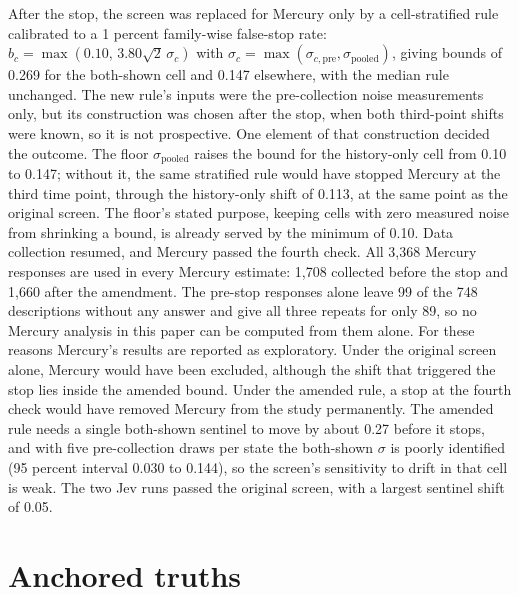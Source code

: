 \documentclass[11pt]{article}
\begin{document}
After the stop, the screen was replaced for Mercury only by a cell-stratified rule calibrated to a 1
percent family-wise false-stop rate: $b_c=\max(0.10,\,3.80\sqrt2\,\sigma_c)$ with
$\sigma_c=\max(\sigma_{c,\text{pre}},\sigma_{\text{pooled}})$, giving bounds of 0.269 for the
both-shown cell and 0.147 elsewhere, with the median rule unchanged. The new rule's inputs were
the pre-collection noise measurements only, but its construction was chosen after the stop, when
both third-point shifts were known, so it is not prospective. One element of that construction
decided the outcome. The floor $\sigma_{\text{pooled}}$ raises the bound for the history-only cell
from 0.10 to 0.147; without it, the same stratified rule would have stopped Mercury at the third
time point, through the history-only shift of 0.113, at the same point as the original screen. The
floor's stated purpose, keeping cells with zero measured noise from shrinking a bound, is already
served by the minimum of 0.10. Data collection resumed, and Mercury passed the fourth check. All
3,368 Mercury responses are used in every Mercury estimate: 1,708 collected before the stop and
1,660 after the amendment. The pre-stop responses alone leave 99 of the 748 descriptions without
any answer and give all three repeats for only 89, so no Mercury analysis in this paper can be
computed from them alone. For these reasons Mercury's results are reported as exploratory. Under the original
screen alone, Mercury would have been excluded, although the shift that triggered the stop lies inside
the amended bound. Under the amended rule, a stop at the fourth check would have removed Mercury from the
study permanently. The amended rule needs a
single both-shown sentinel to move by about 0.27 before it stops, and with five pre-collection draws per
state the both-shown $\sigma$ is poorly identified (95 percent interval 0.030 to 0.144), so the screen's
sensitivity to drift in that cell is weak. The two Jev runs passed the original screen, with a largest
sentinel shift of 0.05.

\section{Anchored truths}
\label{app:anchored}
\setcounter{table}{0}
\end{document}
